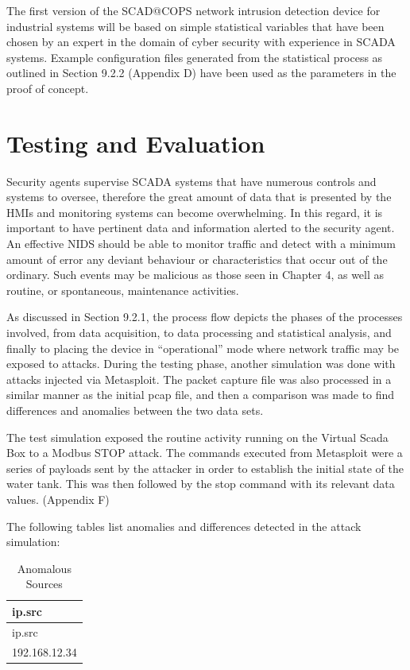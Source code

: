 \documentclass[11pt,]{article}
\begin{document}
The first version of the SCAD@COPS network intrusion detection device
for industrial systems will be based on simple statistical variables
that have been chosen by an expert in the domain of cyber security with
experience in SCADA systems. Example configuration files generated from
the statistical process as outlined in Section 9.2.2 (Appendix D) have
been used as the parameters in the proof of concept.

\newpage

\section{Testing and Evaluation}\label{testing-and-evaluation}

Security agents supervise SCADA systems that have numerous controls and
systems to oversee, therefore the great amount of data that is presented
by the HMIs and monitoring systems can become overwhelming. In this
regard, it is important to have pertinent data and information alerted
to the security agent. An effective NIDS should be able to monitor
traffic and detect with a minimum amount of error any deviant behaviour
or characteristics that occur out of the ordinary. Such events may be
malicious as those seen in Chapter 4, as well as routine, or
spontaneous, maintenance activities.

As discussed in Section 9.2.1, the process flow depicts the phases of
the processes involved, from data acquisition, to data processing and
statistical analysis, and finally to placing the device in
``operational'' mode where network traffic may be exposed to attacks.
During the testing phase, another simulation was done with attacks
injected via Metasploit. The packet capture file was also processed in a
similar manner as the initial pcap file, and then a comparison was made
to find differences and anomalies between the two data sets.

The test simulation exposed the routine activity running on the Virtual
Scada Box to a Modbus STOP attack. The commands executed from Metasploit
were a series of payloads sent by the attacker in order to establish the
initial state of the water tank. This was then followed by the stop
command with its relevant data values. (Appendix F)

The following tables list anomalies and differences detected in the
attack simulation:

\begin{longtable}[c]{@{}l@{}}
\caption{Anomalous Sources}\tabularnewline
\toprule
ip.src\tabularnewline
\midrule
\endfirsthead
\toprule
ip.src\tabularnewline
\midrule
\endhead
192.168.12.34\tabularnewline
\bottomrule
\end{longtable}
\end{document}
